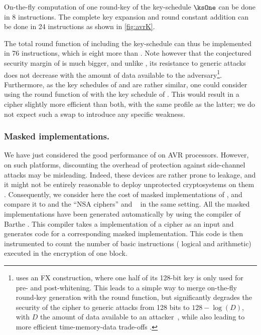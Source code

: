 On-the-fly computation of one round-key of the key-schedule $\ksOne$ can be done in 8 instructions. The complete key expansion and round constant addition can be done in 24 instructions
as shown in \autoref{fig:avrK}.

The total round function of \fly including the key-schedule can thus be implemented in 76 instructions, which is eight more than \pride. Note however that the conjectured security
margin of \fly is much bigger, and unlike \pride, its resistance to generic attacks does not decrease with the amount of data available to the adversary\footnote{\pride uses an FX construction,
where one half of its 128-bit key is only used for pre- and post-whitening. This
leads to a simple way to merge on-the-fly round-key generation with the round function, but significantly degrades the security of the cipher to generic attacks
from 128 bits to $128 - \log(D)$, with $D$ the amount of data available to an attacker~\cite{desx}, while also leading to more efficient time-memory-data trade-offs \cite{itaitmd}.}. Furthermore, as the
key schedules of \fly and \pride are rather similar, one could consider using the round function of \fly with the key schedule of \pride. This would result in a cipher slightly more efficient
than both, with the same profile as the latter; we do not expect such a swap to introduce any specific weakness.

\subsubsection{Masked implementations.}
We have just considered the good performance of \fly on AVR processors. 
However, on such platforms, discounting the overhead of protection 
against side-channel attacks may be misleading. 
Indeed, these devices are rather prone to leakage, and it might not be 
entirely reasonable to deploy unprotected cryptosystems on them \cite{avrleak}.
Consequently, we consider here the cost of masked implementations of \fly, 
and compare it to \pride and the ``NSA ciphers'' \simon and \speck~\cite{NSAciph} in the same setting.
All the masked implementations have been generated automatically by 
using the compiler of Barthe \etal{} \cite{maskingcomp}.
This compiler takes a \C implementation of a cipher as an input and generates \C code for a corresponding masked implementation. This code is then instrumented to count the number of basic instructions
(\eg{} logical and arithmetic) executed in the encryption of one block.
 
